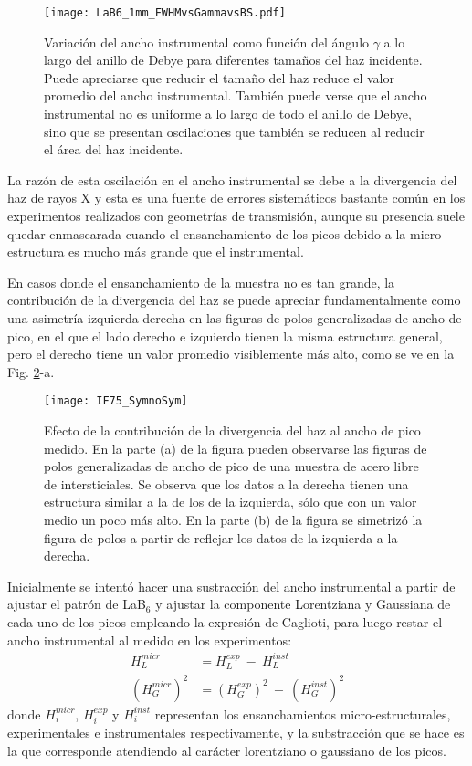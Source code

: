 \begin{figure}[!htb]
  \centering
  \texttt{[image: LaB6\_1mm\_FWHMvsGammavsBS.pdf]}
  \caption{Variación del ancho instrumental como función del ángulo $\gamma$ a lo largo del anillo de Debye para diferentes tamaños del haz incidente. Puede apreciarse que reducir el tamaño del haz reduce el valor promedio del ancho instrumental. También puede verse que el ancho instrumental no es uniforme a lo largo de todo el anillo de Debye, sino que se presentan oscilaciones que también se reducen al reducir el área del haz incidente.}
  \label{fig:LaB6vsGamma}
\end{figure}

La razón de esta oscilación en el ancho instrumental se debe a la divergencia del haz de rayos X\cite{Wcislak2002} y esta es una fuente de errores sistemáticos bastante común en los experimentos realizados con geometrías de transmisión, aunque su presencia suele quedar enmascarada cuando el ensanchamiento de los picos debido a la micro-estructura es mucho más grande que el instrumental.

En casos donde el ensanchamiento de la muestra no es tan grande, la contribución de la divergencia del haz se puede apreciar fundamentalmente como una asimetría izquierda-derecha en las figuras de polos generalizadas de ancho de pico, en el que el lado derecho e izquierdo tienen la misma estructura general, pero el derecho tiene un valor promedio visiblemente más alto, como se ve en la Fig. \ref{fig:IF75NoSym}-a.

\begin{figure}[!htb] 
  \centering
  \texttt{[image: IF75\_SymnoSym]}
  \caption{Efecto de la contribución de la divergencia del haz al ancho de pico medido. En la parte (a) de la figura pueden observarse las figuras de polos generalizadas de ancho de pico de una muestra de acero libre de intersticiales. Se observa que los datos a la derecha tienen una estructura similar a la de los de la izquierda, sólo que con un valor medio un poco más alto. En la parte (b) de la figura se simetrizó la figura de polos a partir de reflejar los datos de la izquierda a la derecha.}
  \label{fig:IF75NoSym}
\end{figure}

Inicialmente se intentó hacer una sustracción del ancho instrumental a partir de ajustar el patrón de LaB$_6$ y ajustar la componente Lorentziana y Gaussiana de cada uno de los picos empleando la expresión de Caglioti\cite{Caglioti1958}, para luego restar el ancho instrumental al medido en los experimentos:
\begin{align}
  H_L^{micr} & = H_L^{exp} \ - \ H_L^{inst} \nonumber \\
  (H_G^{micr})^2 & = (H_G^{exp})^2 \ - \ (H_G^{inst})^2 
  \label{eq:instrumental}
\end{align}
\noindent
donde $H_i^{micr}$, $H_i^{exp}$ y $H_i^{inst}$ representan los ensanchamientos micro-estructurales, experimentales e instrumentales respectivamente, y la substracción que se hace es la que corresponde atendiendo al carácter lorentziano o gaussiano de los picos.

